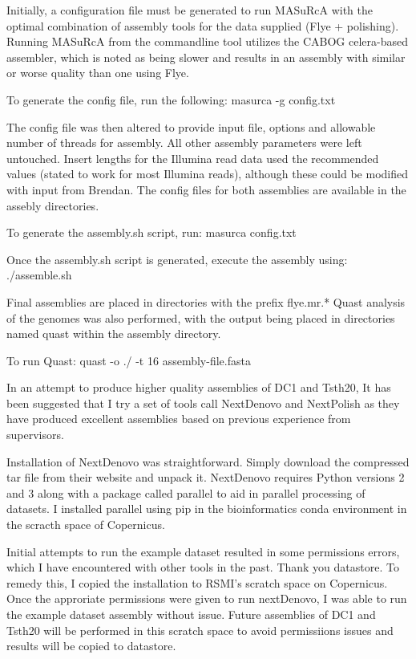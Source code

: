 \documentclass[12pt]{article}
\begin{document}
Initially, a configuration file must be generated to run MASuRcA with
the optimal combination of assembly tools for the data supplied (Flye
+ polishing). Running MASuRcA from the commandline tool utilizes the
CABOG celera-based assembler, which is noted as being slower and
results in an assembly with similar or worse quality than one using
Flye.

To generate the config file, run the following:
masurca -g config.txt

The config file was then altered to provide input file, options and
allowable number of threads for assembly. All other assembly
parameters were left untouched. Insert lengths for the Illumina read
data used the recommended values (stated to work for most Illumina
reads), although these could be modified with input from Brendan. The
config files for both assemblies are available in the assebly
directories.

To generate the assembly.sh script, run:
masurca config.txt

Once the assembly.sh script is generated, execute the assembly using:
./assemble.sh

Final assemblies are placed in directories with the prefix flye.mr.*
Quast analysis of the genomes was also performed, with the output
being placed in directories named quast within the assembly directory.

To run Quast:
quast -o ./ -t 16 assembly-file.fasta

In an attempt to produce higher quality assemblies of DC1 and Tsth20,
It has been suggested that I try a set of tools call NextDenovo and
NextPolish as they have produced excellent assemblies based on
previous experience from supervisors.

Installation of NextDenovo was straightforward. Simply download the
compressed tar file from their website and unpack it. NextDenovo
requires Python versions 2 and 3 along with a package called parallel
to aid in parallel processing of datasets. I installed parallel using
pip in the bioinformatics conda environment in the scracth space of
Copernicus.

Initial attempts to run the example dataset resulted in some
permissions errors, which I have encountered with other tools in the
past. Thank you datastore. To remedy this, I copied the installation
to RSMI's scratch space on Copernicus. Once the approriate permissions
were given to run nextDenovo, I was able to run the example dataset
assembly without issue. Future assemblies of DC1 and Tsth20 will be
performed in this scratch space to avoid permissiions issues and
results will be copied to datastore.
\end{document}
